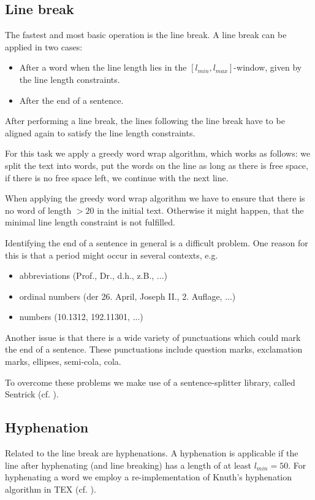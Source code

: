 \documentclass[11pt]{reportAlternative}
\begin{document}
\subsection{Line break}
The fastest and most basic operation is the line break. A line break can be applied in two cases:

\begin{itemize}
	\item After a word when the line length lies in the $[l_{min},l_{max}]$-window,
	given by the line length constraints.
	\item After the end of a sentence.
\end{itemize}
After performing a line break, the lines following the line break have
to be aligned again to satisfy the line length constraints.

For this task we apply a greedy word wrap algorithm, which works as follows: we split the text into words,
put the words on the line as long as there is free space, if there is no free space left, we continue with the next line.

When applying the greedy word wrap algorithm we have to ensure that
there is no word of length $> 20$ in the initial text. Otherwise it might happen, that the minimal line
length constraint is not fulfilled.

Identifying the end of a sentence in general is a difficult problem. One reason for this is that a period
might occur in several contexts, e.g.

\begin{itemize}

	\item abbreviations (Prof., Dr., d.h., z.B., ...)
	\item ordinal numbers (der 26. April, Joseph II., 2. Auflage, ...)
	\item numbers (10.1312, 192.11301, ...)

\end{itemize}

Another issue is that there is a wide variety of punctuations which could mark the end of a sentence. These punctuations include question marks, exclamation marks, ellipses, semi-cola, cola.

To overcome these problems we make use of a sentence-splitter library, called Sentrick (cf. \cite{Sentrick}).

\subsection{Hyphenation}
Related to the line break are hyphenations. A hyphenation is applicable if the line after hyphenating (and line breaking) has a length of at least $l_{min}=50$.
For hyphenating a word we employ a re-implementation of Knuth's hyphenation algorithm in TEX (cf. \cite{Hyphenation}).
\end{document}
